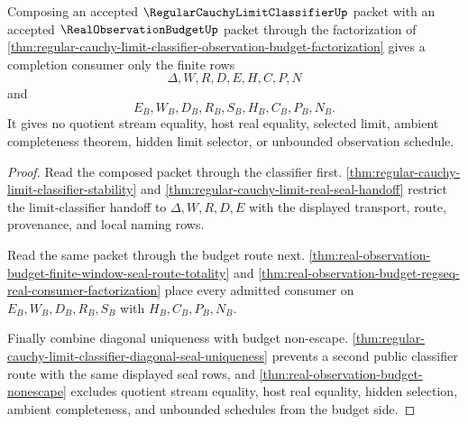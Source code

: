 \begin{theorem}
\label{thm:regular-cauchy-limit-classifier-completion-consumer-boundary}
Composing an accepted $\RegularCauchyLimitClassifierUp$ packet with an accepted $\RealObservationBudgetUp$ packet through the factorization of \autoref{thm:regular-cauchy-limit-classifier-observation-budget-factorization} gives a completion consumer only the finite rows
$$
\Delta,W,R,D,E,H,C,P,N
$$
and
$$
E_B,W_B,D_B,R_B,S_B,H_B,C_B,P_B,N_B.
$$
It gives no quotient stream equality, host real equality, selected limit, ambient completeness theorem, hidden limit selector, or unbounded observation schedule.
\end{theorem}
\begin{proof}
Read the composed packet through the classifier first. \autoref{thm:regular-cauchy-limit-classifier-stability} and \autoref{thm:regular-cauchy-limit-real-seal-handoff} restrict the limit-classifier handoff to $\Delta,W,R,D,E$ with the displayed transport, route, provenance, and local naming rows.

Read the same packet through the budget route next. \autoref{thm:real-observation-budget-finite-window-seal-route-totality} and \autoref{thm:real-observation-budget-regseq-real-consumer-factorization} place every admitted consumer on $E_B,W_B,D_B,R_B,S_B$ with $H_B,C_B,P_B,N_B$.

Finally combine diagonal uniqueness with budget non-escape. \autoref{thm:regular-cauchy-limit-classifier-diagonal-seal-uniqueness} prevents a second public classifier route with the same displayed seal rows, and \autoref{thm:real-observation-budget-nonescape} excludes quotient stream equality, host real equality, hidden selection, ambient completeness, and unbounded schedules from the budget side.
\end{proof}

